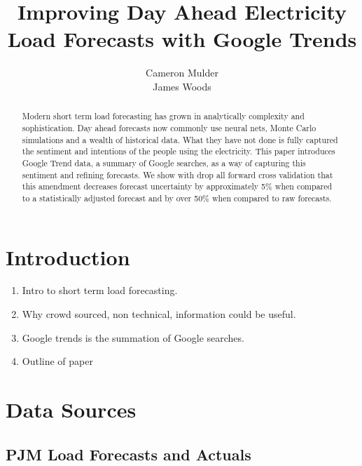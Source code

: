 \documentclass{article}
\title{Improving Day Ahead Electricity Load Forecasts with Google Trends}
\author{Cameron Mulder\\ James Woods}
\begin{document}
\maketitle
{}


\begin{abstract}
Modern short term load forecasting has grown in analytically complexity and sophistication.  Day ahead forecasts now commonly use neural nets, Monte Carlo simulations and a wealth of historical data.  What they have not done is fully captured the sentiment and intentions of the people using the electricity.  This paper introduces Google Trend data, a summary of Google searches, as a way of capturing this sentiment and refining forecasts.  We show with drop all forward cross validation that this amendment decreases forecast uncertainty by approximately 5\% when compared to a statistically adjusted forecast and by over 50\% when compared to raw forecasts.
\end{abstract}



\section{Introduction}



\begin{enumerate}
  \item Intro to short term load forecasting.
  \item Why crowd sourced, non technical,  information could be useful.
  \item Google trends is the summation of Google searches.
  \item Outline of paper
\end{enumerate}


\section{Data Sources}

  \subsection{PJM Load Forecasts and Actuals}
  
  
\end{document}
